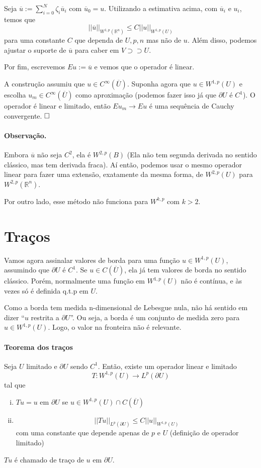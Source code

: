 \documentclass[a4paper, 11pt]{article}
\newcommand{\qed}{$\hfill\square$}
\newcommand{\Rn}{{\mathbb{R}^n}}
\newcommand{\pu}{\partial U}
\begin{document}
Seja \( \overline{u} := \sum_{i=0}^{N} \zeta_i \overline{u}_i \) com \( \overline{u}_0 = u \).  Utilizando a estimativa acima, com \( \overline{u}_i \) e \( u_i \), temos que \[ ||\overline{u}||_{W^{1,p}(\Rn)} \leq C ||u||_{W^{1,p}(U)} \]
para uma constante \( C \) que dependa de \( U,p,n \) mas não de \( u \). Além disso, podemos ajustar o suporte de \( \overline{u} \) para caber em \( V \supset\supset U \).

Por fim, escrevemos \( Eu:=\overline{u} \) e vemos que o operador é linear. 

A construção assumiu que \( u \in C^\infty(\overline{U}) \). Suponha agora que \( u \in W^{1,p}(U) \) e escolha \( u_m \in C^\infty(\overline{U}) \) como aproximação (podemos fazer isso já que \( \pu  \) é \( C^1 \)). O operador é linear e limitado, então \( Eu_m \rightarrow Eu \) é uma sequência de Cauchy convergente. \qed

\paragraph{Observação.} Embora $ \overline{u} $ não seja $ C^2 $, ela é $ W^{2,p}(B) $ (Ela não tem segunda derivada no sentido clássico, mas tem derivada fraca). Aí então, podemos usar o mesmo operador linear para fazer uma extensão, exatamente da mesma forma, de $ W^{2,p}(U) $ para $ W^{2,p}(\Rn) $.

Por outro lado, esse método não funciona para $ W^{k,p} $ com $ k>2 $.




\section{Traços}

Vamos agora assinalar valores de borda para uma função $u \in W^{1,p}(U)$, assumindo que $\pu$ é $C^1$. Se $u \in C(\overline{U})$, ela já tem valores de borda no sentido clássico. Porém, normalmente uma função em $W^{1,p}(U)$ não é contínua, e às vezes só é definida q.t.p em $U$. 

Como a borda tem medida n-dimensional de Lebesgue nula, não há sentido em dizer ``$ u $ restrita a $ \pu $''. Ou seja, a borda é um conjunto de medida zero para $u \in W^{1,p}(U)$. Logo, o valor na fronteira não é relevante.





\paragraph{Teorema dos traços} Seja $U$ limitado e $\pu$ sendo $C^1$. Então, existe um operador linear e limitado \[ T:W^{1,p}(U)\rightarrow L^p(\pu) \] tal que \begin{enumerate}[(i)]
	\item $Tu = u$ em $\pu$ se $u \in W^{1,p}(U) \cap C(\overline{U})$
	\item \[ || Tu ||_{L^p(\pu)} \leq C ||u||_{W^{1,p}(U)} \] com uma constante que depende apenas de $p$ e $U$ (definição de operador limitado)
\end{enumerate} $Tu$ é chamado de traço de $u$ em $\pu$.
\end{document}
